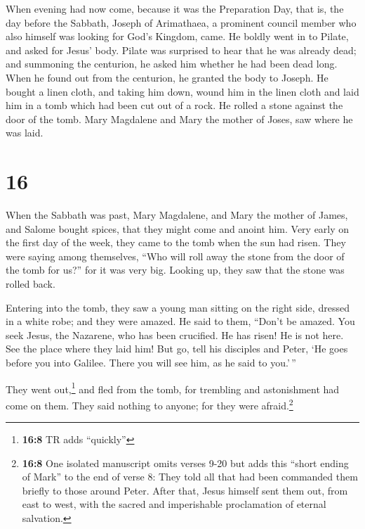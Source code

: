  When evening had now come, because it was the
Preparation Day, that is, the day before the Sabbath, 
Joseph of Arimathaea, a prominent council member who also himself was
looking for God's Kingdom, came. He boldly went in to Pilate, and asked
for Jesus' body.  Pilate was surprised to hear that he
was already dead; and summoning the centurion, he asked him whether he
had been dead long.  When he found out from the
centurion, he granted the body to Joseph.  He bought a
linen cloth, and taking him down, wound him in the linen cloth and laid
him in a tomb which had been cut out of a rock. He rolled a stone
against the door of the tomb.  Mary Magdalene and Mary
the mother of Joses, saw where he was laid.

\hypertarget{section-15}{%
\section{16}\label{section-15}}

 When the Sabbath was past, Mary Magdalene, and Mary the
mother of James, and Salome bought spices, that they might come and
anoint him.  Very early on the first day of the week, they
came to the tomb when the sun had risen.  They were saying
among themselves, ``Who will roll away the stone from the door of the
tomb for us?''  for it was very big. Looking up, they saw
that the stone was rolled back.

 Entering into the tomb, they saw a young man sitting on
the right side, dressed in a white robe; and they were amazed.
 He said to them, ``Don't be amazed. You seek Jesus, the
Nazarene, who has been crucified. He has risen! He is not here. See the
place where they laid him!  But go, tell his disciples and
Peter, `He goes before you into Galilee. There you will see him, as he
said to you.'\,''

 They went out,\footnote{\textbf{16:8} TR adds ``quickly''}
and fled from the tomb, for trembling and astonishment had come on them.
They said nothing to anyone; for they were afraid.\footnote{\textbf{16:8}
  One isolated manuscript omits verses 9-20 but adds this ``short ending
  of Mark'' to the end of verse 8: They told all that had been commanded
  them briefly to those around Peter. After that, Jesus himself sent
  them out, from east to west, with the sacred and imperishable
  proclamation of eternal salvation.}

